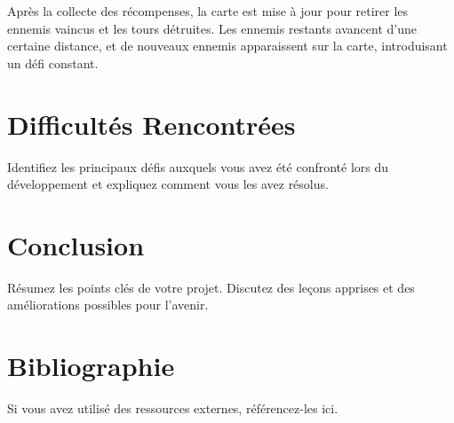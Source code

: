 \documentclass{article}
\begin{document}
Après la collecte des récompenses, la carte est mise à jour pour retirer les ennemis vaincus et les tours détruites. Les ennemis restants avancent d'une certaine distance, et de nouveaux ennemis apparaissent sur la carte, introduisant un défi constant.

\section{Difficultés Rencontrées}
Identifiez les principaux défis auxquels vous avez été confronté lors du développement et expliquez comment vous les avez résolus.

\section{Conclusion}
Résumez les points clés de votre projet. Discutez des leçons apprises et des améliorations possibles pour l'avenir.

\section*{Bibliographie}
Si vous avez utilisé des ressources externes, référencez-les ici.
\end{document}
